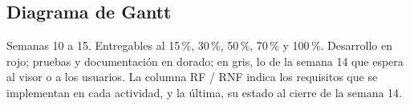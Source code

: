 \subsection{Diagrama de Gantt}
Semanas 10 a 15. Entregables al 15\,\%, 30\,\%, 50\,\%, 70\,\% y 100\,\%. Desarrollo en rojo; pruebas y documentación en dorado; en gris, lo de la semana 14 que espera al visor o a los usuarios. La columna RF / RNF indica los requisitos que se implementan en cada actividad, y la última, su estado al cierre de la semana 14.

\newcommand{\R}{\cellcolor{rojo}}
\newcommand{\G}{\cellcolor{dorado}}
\newcommand{\Pe}{\cellcolor{gray!45}}
\newcommand{\sem}[3]{\parbox[c][1.15cm][c]{0.95cm}{\centering\tiny\textbf{\textcolor{white}{#1}}\\ \textcolor{white}{#2}\\ \textbf{\textcolor{dorado}{#3}}}}

